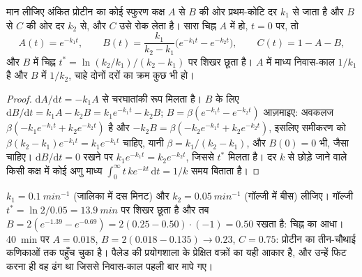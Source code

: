 \begin{theorem}[क्रमिक कक्ष और स्फुरण--अनुधावन वक्र]\label{thm:b3:membrane-traffic:pulse-chase}
मान लीजिए अंकित प्रोटीन का कोई स्फुरण कक्ष $A$ से $B$ की ओर
प्रथम-कोटि दर $k_{1}$ से जाता है और $B$ से $C$ की ओर दर $k_{2}$ से, और
$C$ उसे रोक लेता है। सारा चिह्न $A$ में हो, $t = 0$ पर, तो
\[
A(t) = e^{-k_{1}t},\qquad
B(t) = \frac{k_{1}}{k_{2} - k_{1}}\bigl(e^{-k_{1}t} - e^{-k_{2}t}\bigr),
\qquad
C(t) = 1 - A - B,
\]
और $B$ में चिह्न $t^{*} = \ln(k_{2}/k_{1})/(k_{2} - k_{1})$ पर शिखर छूता है।
$A$ में माध्य निवास-काल $1/k_{1}$ है और $B$ में $1/k_{2}$,
चाहे दोनों दरों का क्रम कुछ भी हो।
\end{theorem}
\begin{proof}
$\mathrm{d}A/\mathrm{d}t = -k_{1}A$ से चरघातांकी रूप मिलता है। $B$ के लिए
$\mathrm{d}B/\mathrm{d}t = k_{1}A - k_{2}B = k_{1}e^{-k_{1}t} - k_{2}B$;
$B = \beta(e^{-k_{1}t} - e^{-k_{2}t})$ आज़माइए: अवकलज
$\beta(-k_{1}e^{-k_{1}t} + k_{2}e^{-k_{2}t})$ है और $-k_{2}B = \beta(-k_{2}
e^{-k_{1}t} + k_{2}e^{-k_{2}t})$, इसलिए समीकरण को $\beta(k_{2}
- k_{1})e^{-k_{1}t} = k_{1}e^{-k_{1}t}$ चाहिए, यानी $\beta = k_{1}/(k_{2} -
k_{1})$, और $B(0) = 0$ भी, जैसा चाहिए। $\mathrm{d}B/\mathrm{d}t =
0$ रखने पर $k_{1}e^{-k_{1}t} = k_{2}e^{-k_{2}t}$, जिससे $t^{*}$ मिलता
है। दर $k$ से छोड़े जाने वाले किसी कक्ष में कोई अणु माध्य $\int_{0}^{
\infty} t\,k e^{-kt}\,\mathrm{d}t = 1/k$ समय बिताता है।
\end{proof}

\begin{example}[संख्याओं में पैलेड की कोशिका]\label{ex:b3:membrane-traffic:palade}
$k_{1} = \qty{0.1}{min^{-1}}$ (जालिका में दस मिनट) और
$k_{2} = \qty{0.05}{min^{-1}}$ (गॉल्जी में बीस) लीजिए। गॉल्जी
$t^{*} = \ln 2/0.05 = \qty{13.9}{min}$ पर शिखर छूता है और तब $B = 2(e^{-1.39} -
e^{-0.69}) = 2(0.25 - 0.50)\cdot(-1) = 0.50$ रखता है: चिह्न का आधा।
\qty{40}{min} पर $A = 0.018$, $B = 2(0.018 - 0.135) \to 0.23$, $C = 0.75$:
प्रोटीन का तीन-चौथाई कणिकाओं तक पहुँच चुका है। पैलेड की प्रयोगशाला के
प्रेक्षित वक्रों का यही आकार है, और उन्हें फिट करना ही वह ढंग था जिससे
निवास-काल पहली बार मापे गए।
\end{example}

